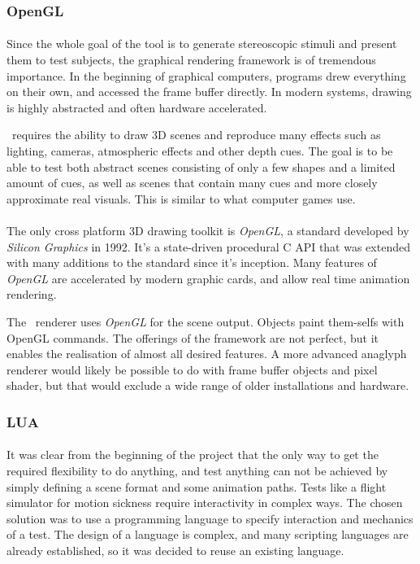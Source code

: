 \subsubsection{OpenGL\label{FrameworkOpenGL}}
\paragraph{}
Since the whole goal of the tool is to generate stereoscopic stimuli and present them to test subjects,
the graphical rendering framework is of tremendous importance.
In the beginning of graphical computers, programs drew everything on their own, and accessed the frame buffer directly.
In modern systems, drawing is highly abstracted and often hardware accelerated.

\ER\ requires the ability to draw 3D scenes and reproduce many effects such as lighting, cameras, atmospheric effects and other depth cues.
The goal is to be able to test both abstract scenes consisting of only a few shapes and a limited amount of cues,
as well as scenes that contain many cues and more closely approximate real visuals.
This is similar to what computer games use.

\paragraph{}
The only cross platform 3D drawing toolkit is \textit{OpenGL}\cite{opengl}, a standard developed by \textit{Silicon Graphics} in 1992.
It's a state-driven procedural C API that was extended with many additions to the standard since it's inception.
Many features of \textit{OpenGL} are accelerated by modern graphic cards, and allow real time animation rendering.

The \ER\ renderer uses \textit{OpenGL} for the scene output.
Objects paint them-selfs with OpenGL commands.
The offerings of the framework are not perfect, but it enables the realisation of almost all desired features.
A more advanced anaglyph renderer would likely be possible to do with frame buffer objects and pixel shader, but that would exclude a wide range of older installations and hardware.


\subsubsection{LUA\label{FrameworkLua}}
\paragraph{}
It was clear from the beginning of the project that the only way to get the required flexibility to do anything, and test anything can not be achieved by simply defining a scene format and some animation paths.
Tests like a flight simulator for motion sickness require interactivity in complex ways.
The chosen solution was to use a programming language to specify interaction and mechanics of a test.
The design of a language is complex, and many scripting languages are already established, so it was decided to reuse an existing language.

